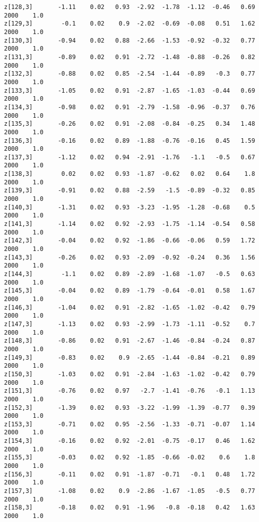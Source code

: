 \documentclass[11pt]{article}
\begin{document}
\begin{Verbatim}[commandchars=\\\{\}]
z[128,3]       -1.11    0.02   0.93  -2.92  -1.78  -1.12  -0.46   0.69   2000    1.0
z[129,3]        -0.1    0.02    0.9  -2.02  -0.69  -0.08   0.51   1.62   2000    1.0
z[130,3]       -0.94    0.02   0.88  -2.66  -1.53  -0.92  -0.32   0.77   2000    1.0
z[131,3]       -0.89    0.02   0.91  -2.72  -1.48  -0.88  -0.26   0.82   2000    1.0
z[132,3]       -0.88    0.02   0.85  -2.54  -1.44  -0.89   -0.3   0.77   2000    1.0
z[133,3]       -1.05    0.02   0.91  -2.87  -1.65  -1.03  -0.44   0.69   2000    1.0
z[134,3]       -0.98    0.02   0.91  -2.79  -1.58  -0.96  -0.37   0.76   2000    1.0
z[135,3]       -0.26    0.02   0.91  -2.08  -0.84  -0.25   0.34   1.48   2000    1.0
z[136,3]       -0.16    0.02   0.89  -1.88  -0.76  -0.16   0.45   1.59   2000    1.0
z[137,3]       -1.12    0.02   0.94  -2.91  -1.76   -1.1   -0.5   0.67   2000    1.0
z[138,3]        0.02    0.02   0.93  -1.87  -0.62   0.02   0.64    1.8   2000    1.0
z[139,3]       -0.91    0.02   0.88  -2.59   -1.5  -0.89  -0.32   0.85   2000    1.0
z[140,3]       -1.31    0.02   0.93  -3.23  -1.95  -1.28  -0.68    0.5   2000    1.0
z[141,3]       -1.14    0.02   0.92  -2.93  -1.75  -1.14  -0.54   0.58   2000    1.0
z[142,3]       -0.04    0.02   0.92  -1.86  -0.66  -0.06   0.59   1.72   2000    1.0
z[143,3]       -0.26    0.02   0.93  -2.09  -0.92  -0.24   0.36   1.56   2000    1.0
z[144,3]        -1.1    0.02   0.89  -2.89  -1.68  -1.07   -0.5   0.63   2000    1.0
z[145,3]       -0.04    0.02   0.89  -1.79  -0.64  -0.01   0.58   1.67   2000    1.0
z[146,3]       -1.04    0.02   0.91  -2.82  -1.65  -1.02  -0.42   0.79   2000    1.0
z[147,3]       -1.13    0.02   0.93  -2.99  -1.73  -1.11  -0.52    0.7   2000    1.0
z[148,3]       -0.86    0.02   0.91  -2.67  -1.46  -0.84  -0.24   0.87   2000    1.0
z[149,3]       -0.83    0.02    0.9  -2.65  -1.44  -0.84  -0.21   0.89   2000    1.0
z[150,3]       -1.03    0.02   0.91  -2.84  -1.63  -1.02  -0.42   0.79   2000    1.0
z[151,3]       -0.76    0.02   0.97   -2.7  -1.41  -0.76   -0.1   1.13   2000    1.0
z[152,3]       -1.39    0.02   0.93  -3.22  -1.99  -1.39  -0.77   0.39   2000    1.0
z[153,3]       -0.71    0.02   0.95  -2.56  -1.33  -0.71  -0.07   1.14   2000    1.0
z[154,3]       -0.16    0.02   0.92  -2.01  -0.75  -0.17   0.46   1.62   2000    1.0
z[155,3]       -0.03    0.02   0.92  -1.85  -0.66  -0.02    0.6    1.8   2000    1.0
z[156,3]       -0.11    0.02   0.91  -1.87  -0.71   -0.1   0.48   1.72   2000    1.0
z[157,3]       -1.08    0.02    0.9  -2.86  -1.67  -1.05   -0.5   0.77   2000    1.0
z[158,3]       -0.18    0.02   0.91  -1.96   -0.8  -0.18   0.42   1.63   2000    1.0

\end{Verbatim}
\end{document}
